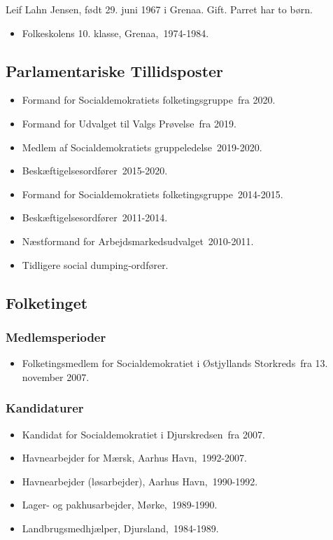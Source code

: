 \documentclass[11pt, a4paper]{awesome-cv}
\begin{document}
\makecvheader[R]
\makelettertitle
\begin{cvletter}
Leif Lahn Jensen, født 29. juni 1967 i Grenaa. Gift. Parret har to børn.

\begin{itemize}
\item Folkeskolens 10. klasse, Grenaa, 1974-1984.
\end{itemize}
\subsection*{Parlamentariske Tillidsposter}
\begin{itemize}
\item Formand for Socialdemokratiets folketingsgruppe fra 2020.
\item Formand for Udvalget til Valgs Prøvelse fra 2019.
\item Medlem af Socialdemokratiets gruppeledelse 2019-2020.
\item Beskæftigelsesordfører 2015-2020.
\item Formand for Socialdemokratiets folketingsgruppe 2014-2015.
\item Beskæftigelsesordfører 2011-2014.
\item Næstformand for Arbejdsmarkedsudvalget 2010-2011.
\item Tidligere social dumping-ordfører.
\end{itemize}
\subsection*{Folketinget}
\subsubsection*{Medlemsperioder}
\begin{itemize}
\item Folketingsmedlem for Socialdemokratiet i Østjyllands Storkreds fra 13. november 2007.
\end{itemize}
\subsubsection*{Kandidaturer}
\begin{itemize}
\item Kandidat for Socialdemokratiet i Djurskredsen fra 2007.
\end{itemize}
\begin{itemize}
\item Havnearbejder for Mærsk, Aarhus Havn, 1992-2007.
\item Havnearbejder (løsarbejder), Aarhus Havn, 1990-1992.
\item Lager- og pakhusarbejder, Mørke, 1989-1990.
\item Landbrugsmedhjælper, Djursland, 1984-1989.
\end{itemize}
\end{cvletter}
\end{document}
